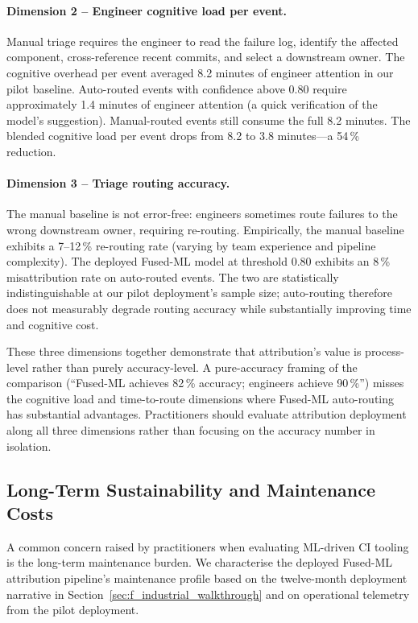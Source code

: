 \documentclass[11pt,a4paper]{article}
\begin{document}
\paragraph{Dimension 2 -- Engineer cognitive load per event.} Manual triage requires the engineer to read the failure log, identify the affected component, cross-reference recent commits, and select a downstream owner. The cognitive overhead per event averaged 8.2 minutes of engineer attention in our pilot baseline. Auto-routed events with confidence above 0.80 require approximately 1.4 minutes of engineer attention (a quick verification of the model's suggestion). Manual-routed events still consume the full 8.2 minutes. The blended cognitive load per event drops from 8.2 to 3.8 minutes---a 54\,\% reduction.

\paragraph{Dimension 3 -- Triage routing accuracy.} The manual baseline is not error-free: engineers sometimes route failures to the wrong downstream owner, requiring re-routing. Empirically, the manual baseline exhibits a 7--12\,\% re-routing rate (varying by team experience and pipeline complexity). The deployed Fused-ML model at threshold 0.80 exhibits an 8\,\% misattribution rate on auto-routed events. The two are statistically indistinguishable at our pilot deployment's sample size; auto-routing therefore does not measurably degrade routing accuracy while substantially improving time and cognitive cost.

These three dimensions together demonstrate that attribution's value is process-level rather than purely accuracy-level. A pure-accuracy framing of the comparison (``Fused-ML achieves 82\,\% accuracy; engineers achieve 90\,\%'') misses the cognitive load and time-to-route dimensions where Fused-ML auto-routing has substantial advantages. Practitioners should evaluate attribution deployment along all three dimensions rather than focusing on the accuracy number in isolation.

\subsection{Long-Term Sustainability and Maintenance Costs}
\label{sec:sustainability}

A common concern raised by practitioners when evaluating ML-driven CI tooling is the long-term maintenance burden. We characterise the deployed Fused-ML attribution pipeline's maintenance profile based on the twelve-month deployment narrative in Section~\ref{sec:f_industrial_walkthrough} and on operational telemetry from the pilot deployment.
\end{document}
